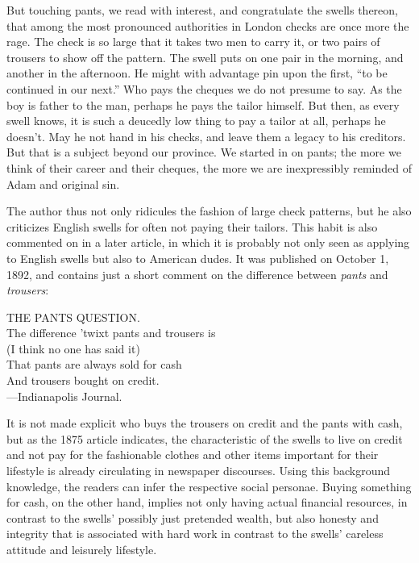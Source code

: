\begin{ipquote}
But touching pants, we read with interest, and congratulate the swells thereon, that among the most pronounced authorities in London checks are once more the rage. The check is so large that it takes two men to carry it, or two pairs of trousers to show off the pattern. The swell puts on one pair in the morning, and another in the afternoon. He might with advantage pin upon the first, “to be continued in our next.” Who pays the cheques we do not presume to say. As the boy is father to the man, perhaps he pays the tailor himself. But then, as every swell knows, it is such a deucedly low thing to pay a tailor at all, perhaps he do{\kern0pt}esn’t. May he not hand in his checks, and leave them a legacy to his creditors. But that is a subject beyond our province. We started in on pants; the more we think of their career and their cheques, the more we are inexpressibly reminded of Adam and original sin.
\end{ipquote}


The author thus not only ridicules the fashion of large check patterns, but he also criticizes English swells for often not paying their tailors. This habit is also commented on in a later article, in which it is probably not only seen as applying to English swells but also to American dudes. It was published on October 1, 1892, and contains just a short comment on the difference between \emph{pants} and \emph{trousers}:


\begin{ipquote}
THE PANTS QUESTION.\\
The difference ’twixt pants and trousers is\\
(I think no one has said it)\\
That pants are always sold for cash\\
And trousers bought on credit.\\
—Indianapolis Journal.
\end{ipquote}


It is not made explicit who buys the trousers on credit and the pants with cash, but as the 1875 article indicates, the characteristic of the swells to live on credit and not pay for the fashionable clothes and other items important for their lifestyle is already circulating in newspaper discourses. Using this background knowledge, the readers can infer the respective social personae. Buying something for cash, on the other hand, implies not only having actual financial resources, in contrast to the swells’ possibly just pretended wealth, but also honesty and integrity that is associated with hard work in contrast to the swells’ careless attitude and leisurely lifestyle.


